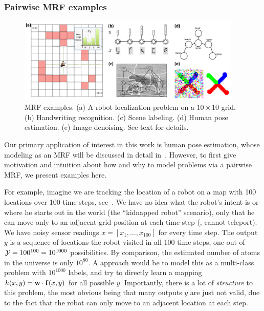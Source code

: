 \subsubsection{Pairwise MRF examples}\label{sec:pairwise-mrf}
\begin{figure}[tb]
\begin{center}
\includegraphics[width=0.95\textwidth]{figs/mrf-examples.pdf}
\caption[MRF examples]{MRF examples.  (a) A robot localization problem on a $10 
\times 10$ grid. (b) Handwriting recognition.  (c) Scene labeling.  (d) Human 
pose estimation.  (e) Image denoising. See text for details. }
\label{fig:mrf-examples}
\end{center}
\end{figure}



Our primary application of interest in this work is human pose estimation, 
whose modeling as an MRF will be discussed in detail in~.  However, 
to first give motivation and intuition about how and why to model problems via 
a pairwise MRF, we present examples here.

For example, imagine we are tracking the location of a robot on a map with 100 
locations over 100 time steps, see~.  We have no idea 
what the robot's intent is or where he starts out in the world (the ``kidnapped 
robot'' scenario), only that he can move only to an adjacent grid position at 
each time step (\ie, cannot teleport).  We have noisy sensor readings $x = 
[x_1,\ldots,x_{100}]$ for every time step.  The output $y$ is a sequence of 
locations the robot visited in all 100 time steps, one out of $\mathcal{Y} = 100^{100} 
= 10^{1000}$ possibilities.  By comparison, the estimated number of atoms in 
the universe is only $10^{80}$.  A \naive approach would be to model this as a 
multi-class problem with $10^{1000}$ labels, and try to directly learn a 
mapping $h(x,y) = \mathbf{w} \cdot \mathbf{f}(x,y)$ for all possible $y$.  Importantly, there 
is a lot of {\em structure} to this problem, the most obvious being that many 
outputs $y$ are just not valid, due to the fact that the robot can only move to 
an adjacent location at each step.

